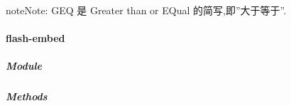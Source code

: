 \documentclass[letterpaper,10pt,english]{sphinxmanual}
\begin{document}
\begin{fulllineitems}
\begin{notice}{note}{Note:}
GEQ 是 Greater than or EQual 的简写,即''大于等于''.
\end{notice}

\end{fulllineitems}



\paragraph{flash-embed}
\label{api/component/flash/flash-embed:flash-embed}\label{api/component/flash/flash-embed::doc}

\subparagraph{Module}
\label{api/component/flash/flash-embed:module}\begin{quote}

{\hyperref[api/component/flash/index:module-flash]{}}
\end{quote}


\subparagraph{Methods}
\label{api/component/flash/flash-embed:methods}
\end{document}
